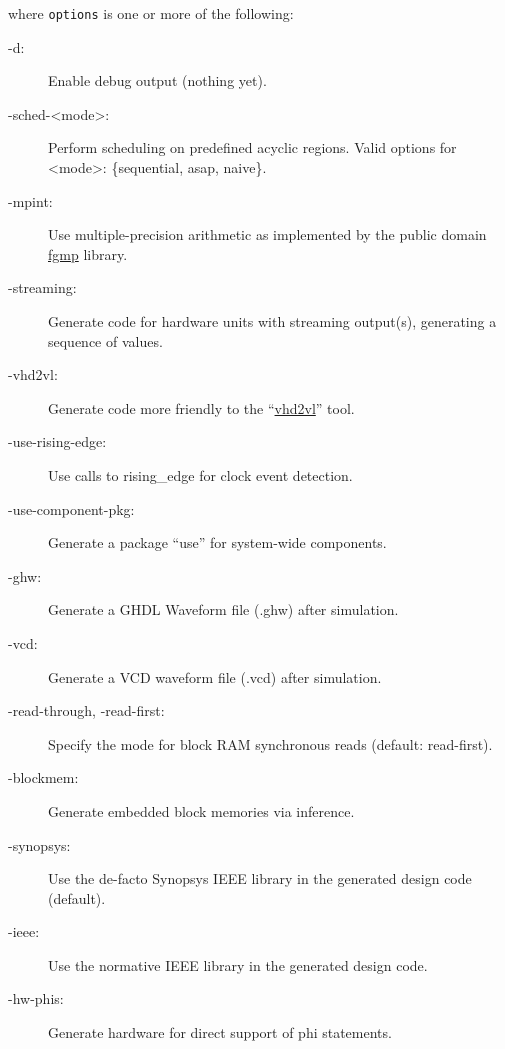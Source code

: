 \documentclass[a4paper]{article}
\begin{document}
where \texttt{options} is one or more of the following:
%
\begin{description}
\item[{-d:}] \leavevmode 
Enable debug output (nothing yet).

\item[{-sched-<mode>:}] \leavevmode 
Perform scheduling on predefined acyclic regions.
Valid options for <mode>: \{sequential, asap, naive\}.

\item[{-mpint:}] \leavevmode 
Use multiple-precision arithmetic as implemented
by the public domain \href{http://stuff.mit.edu/afs/sipb/project/stk/src/STk-2.2.0/Mp/fgmp-1.0b5/}{fgmp} library.

\item[{-streaming:}] \leavevmode 
Generate code for hardware units with streaming
output(s), generating a sequence of values.

\item[{-vhd2vl:}] \leavevmode 
Generate code more friendly to the ``\href{http://doolittle.icarus.com/~larry/vhd2vl/}{vhd2vl}'' tool.

\item[{-use-rising-edge:}] \leavevmode 
Use calls to rising\_edge for clock event detection.

\item[{-use-component-pkg:}] \leavevmode 
Generate a package ``use'' for system-wide components.

\item[{-ghw:}] \leavevmode 
Generate a GHDL Waveform file (.ghw) after simulation.

\item[{-vcd:}] \leavevmode 
Generate a VCD waveform file (.vcd) after simulation.

\item[{-read-through, -read-first:}] \leavevmode 
Specify the mode for block RAM synchronous reads (default:
read-first).

\item[{-blockmem:}] \leavevmode 
Generate embedded block memories via inference.

\item[{-synopsys:}] \leavevmode 
Use the de-facto Synopsys IEEE library in the
generated design code (default).

\item[{-ieee:}] \leavevmode 
Use the normative IEEE library in the generated design code.

\item[{-hw-phis:}] \leavevmode 
Generate hardware for direct support of phi statements.


\end{description}
\end{document}
